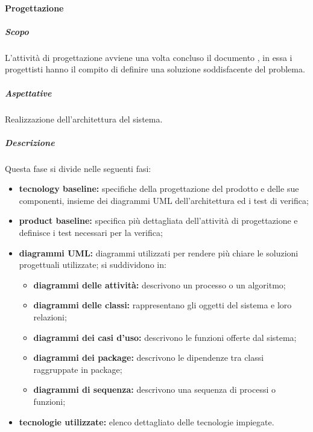 			\paragraph {Progettazione}
				\subparagraph{Scopo}
					L'attività di progettazione avviene una volta concluso il documento , in essa i progettisti hanno il compito di definire una soluzione soddisfacente del problema.
				\subparagraph{Aspettative}
					Realizzazione dell'architettura del sistema.
				\subparagraph{Descrizione}
					Questa fase si divide nelle seguenti fasi: 
					\begin{itemize}
						\item \textbf{tecnology baseline:} specifiche della progettazione del prodotto e delle sue componenti, insieme dei diagrammi UML dell'architettura ed i test di verifica;
						\item \textbf{product baseline:} specifica più dettagliata dell'attività di progettazione e definisce i test necessari per la verifica;
						\item \textbf{diagrammi UML:} diagrammi utilizzati per rendere più chiare le soluzioni progettuali utilizzate; si suddividono in:	
						\begin{itemize}
							\item \textbf{diagrammi delle attività:} descrivono un processo o un algoritmo;
							\item \textbf{diagrammi delle classi:} rappresentano gli oggetti del sistema e loro relazioni;
							\item \textbf{diagrammi dei casi d'uso:} descrivono le funzioni offerte dal sistema;
							\item \textbf{diagrammi dei package:} descrivono le dipendenze tra classi raggruppate in package;
							\item \textbf{diagrammi di sequenza:} descrivono una sequenza di processi o funzioni;
						\end{itemize}
						\item \textbf{tecnologie utilizzate:} elenco dettagliato delle tecnologie impiegate.
						\end{itemize}	
				

